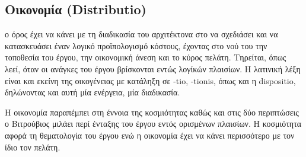   
  
  

\subsection{Οικονομία (Distributio)}

ο όρος έχει να κάνει με τη διαδικασία του αρχιτέκτονα στο να σχεδιάσει και να κατασκευάσει έναν λογικό προϊπολογισμό κόστους, έχοντας στο νού του την τοποθεσία του έργου, την οικονομική άνεση και το κύρος πελάτη. Τηρείται, όπως λεεί, όταν οι ανάγκες του έργου βρίσκονται εντώς λογίκών πλαισίων. \cite[σ.~55,97]{vitruvius-lefas} Η λατινική λέξη είναι και εκείνη της οικογένειας με κατάληξη σε -tio, -tionis, όπως και η dispositio, δηλώνοντας και αυτή μία ενέργεια, μία διαδικασία. 

Η οικονομία παραπέμπει στη έννοια της κοσμιότητας καθώς και στις δύο περιπτώσεις ο Βιτρούβιος μιλάει περί ένταξης του έργου εντός ορισμένων πλαισίων. Η κοσμιότητα αφορά τη θεματολογία του έργου ενώ η οικονομία έχει να κάνει περισσότερο με τον ίδιο τον πελάτη.



  
